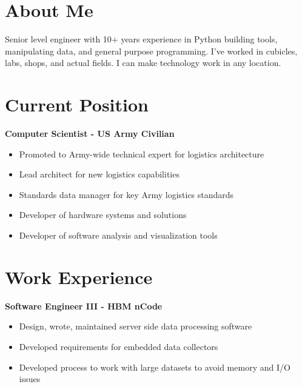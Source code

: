 \documentclass[a4paper,10pt]{article}
\begin{document}
\begin{adjustbox}{valign=t}
\begin{minipage}{0.6\textwidth} %

\section*{About Me}

	\raggedright
	Senior level engineer with 10+ years experience in Python building tools, manipulating data, and general purpose programming. I've worked in cubicles, labs, shops, and actual fields. I can make technology work in any location.
\section*{Current Position}
\begin{description}
\raggedright
\item[\normalfont \textcolor{ColorOne}{Sep. 2016 - Present}] \textbf{Computer Scientist - US Army Civilian}\\ \medskip
\begin{itemize}[align=right, itemindent=-1.5em,leftmargin=0pt]
	\item Promoted to Army-wide technical expert for logistics architecture
	\item Lead architect for new logistics capabilities
	\item Standards data manager for key Army logistics standards
	\item Developer of hardware systems and solutions
	\item Developer of software analysis and visualization tools
\end{itemize}
\end{description}

\section*{Work Experience}
\begin{description}
\raggedright
\item[\normalfont \textcolor{ColorOne}{Feb. 2014 - Sep. 2016}] \textbf{Software Engineer III - HBM nCode} \\ \medskip

\begin{itemize}[align=right, itemindent=-1.5em,leftmargin=0pt]
	\item Design, wrote, maintained server side data processing software
	\item Developed requirements for embedded data collectors
	\item Developed process to work with large datasets to avoid memory and I/O issues
\end{itemize}



\end{description}
\end{minipage}
\end{adjustbox}
\end{document}
